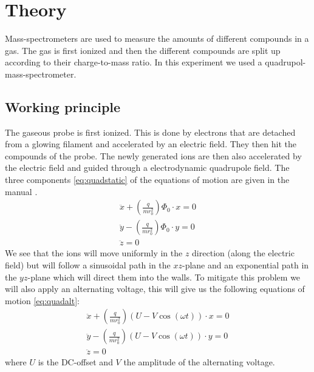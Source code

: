 \section{Theory} \label{sec:theory}
Mass-spectrometers are used to measure the amounts of different compounds in a gas. The gas is first ionized and then the different compounds are split up according to their charge-to-mass ratio. In this experiment we used a quadrupol-mass-spectrometer.

\subsection{Working principle}
    The gaseous probe is first ionized. This is done by electrons that are detached from a glowing filament and accelerated by an electric field. They then hit the compounds of the probe.  The newly generated ions are then also accelerated by the electric field and guided through a electrodynamic quadrupole field. The three components \eqref{eq:quadstatic} of the equations of motion are given in the manual \cite{manual}.
    \begin{equation}
        \begin{aligned}
            \ddot x + \left(\frac{q}{mr_0^2}\right)\Phi_0\cdot x= 0 \\
            \ddot y - \left(\frac{q}{mr_0^2}\right)\Phi_0\cdot y= 0 \\
            \ddot z = 0 
            \label{eq:quadstatic}
        \end{aligned}
    \end{equation}
    We see that the ions will move uniformly in the $z$ direction (along the electric field) but will follow a sinusoidal path in the $xz$-plane and an exponential path in the $yz$-plane which will direct them into the walls. To mitigate this problem we will also apply an alternating voltage, this will give us the following equations of motion \eqref{eq:quadalt}:
    \begin{equation}
        \begin{aligned}
            \ddot x + \left(\frac{q}{mr_0^2}\right)(U-V\cos(\omega t))\cdot x= 0 \\
            \ddot y - \left(\frac{q}{mr_0^2}\right)(U-V\cos(\omega t))\cdot y= 0 \\
            \ddot z = 0 
            \label{eq:quadalt}
        \end{aligned}
    \end{equation}
    where $U$ is the DC-offset and $V$ the amplitude of the alternating voltage.
